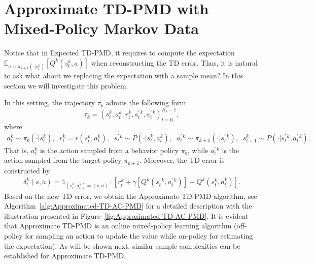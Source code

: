 \documentclass[10pt]{article}
\newcommand{\E}{\mathbb{E}}
\newcommand{\ls}{\left}
\newcommand{\rs}{\right}
\theoremstyle{plain}
\theoremstyle{definition}
\begin{document}
\section{Approximate TD-PMD with Mixed-Policy Markov Data}
\label{sec:Approximated-TD-AC-PMD}
Notice that in Expected TD-PMD, it requires to compute the expectation $\E_{a \sim \pi_{k+1}(\cdot|s_t^k)} [Q^k(s^k_t, a)]$ when reconstructing  the TD error.  Thus, it is natural to ask what about we replacing the expectation with a sample mean? In this section we will investigate this problem. 


In this setting, the trajectory $\tau_k$ admits the following form 
\[
\tau_k = (s_t^k, a_t^k, r_t^k, s_t^{\prime \, k}, a_t^{\prime \, k})_{t=0}^{B_k-1},
\]
where 
\begin{align*}
    a_t^k \sim \pi_b(\cdot | s_t^k), \;\; r_t^k = r(s_t^k, a_t^k), \;\; s^{\prime \, k}_t \sim P(\cdot | s_t^k, a_t^k), \;\; a_t^{\prime \, k} \sim \pi_{k+1}(\cdot|s^{\prime \, k}_t), \;\; s_{t+1}^k \sim P(\cdot|s_t^{\prime \, k}, a_t^{\prime \, k}).
\end{align*}
That is, $a^k_t$ is the action sampled from a behavior policy $\pi_b$, while $a^{\prime \, k}_t$ is the action sampled from the target policy $\pi_{k+1}$.  
Moreover, the TD error is constructed by
\begin{align*}
    \delta_t^k(s,a) = \mathds{1}_{(s^k_t,a^k_t)=(s,a) } \cdot\ls[r_t^k + \gamma\ls[Q^k(s_t^{\prime \, k}, a_t^{\prime \, k})\rs] - Q^k(s^k_t, a^k_t)\rs].
\end{align*}
Based on the new TD error, we obtain the {Approximate TD-PMD} algorithm, see Algorithm~\ref{alg:Approximated-TD-AC-PMD} for a detailed description with the illustration presented in Figure~\ref{fig:Approximated-TD-AC-PMD}. It is evident that Approximate TD-PMD is an online mixed-policy learning algorithm (off-policy for sampling an action to update the value while on-policy for estimating the expectation). As will be shown next, similar sample complexities can be established for Approximate TD-PMD. 
\end{document}
